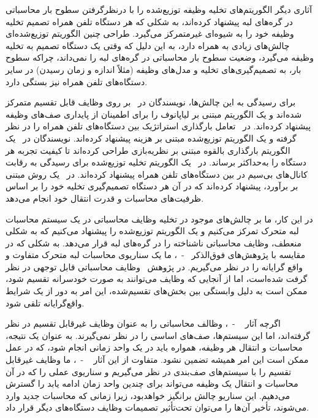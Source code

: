 آثاری دیگر الگوریتم‌های تخلیه وظیفه توزیع‌شده را با درنظرگرفتن سطوح بار محاسباتی در گره‌های لبه پیشنهاد کرده‌اند، به شکلی که هر دستگاه تلفن همراه تصمیم تخلیه وظیفه خود را به شیوه‌ای غیرمتمرکز می‌گیرد. طراحی چنین الگوریتم توزیع‌شده‌ای چالش‌های زیادی به همراه دارد، به این دلیل که وقتی یک دستگاه تصمیم به تخلیه وظیفه می‌گیرد، وضعیت  سطوح بار محاسباتی در گره‌های لبه را نمی‌داند، چراکه سطوح بار، به تصمیم‌گیری‌های تخلیه و مدل‌های وظیفه (مثلاً اندازه و زمان رسیدن) در سایر دستگاه‌های تلفن همراه نیز بستگی دارد. 

برای رسیدگی به این چالش‌ها، نویسندگان در~\cite{lyu2018distributed} بر روی وظایف قابل تقسیم متمرکز شده‌اند و یک الگوریتم مبتنی بر لیاپانوف را برای اطمینان از پایداری صف‌های وظیفه پیشنهاد کرده‌اند. در~\cite{li2019incentive} تعامل بارگذاری استراتژیک بین دستگاه‌های تلفن همراه را در نظر گرفته و یک الگوریتم توزیع‌شده مبتنی بر هزینه پیشنهاد کرده‌اند. نویسندگان در~\cite{shah2018hierarchical} یک الگوریتم بارگذاری بالقوه مبتنی بر نظریه‌بازی طراحی کرده‌اند تا کیفیت تجربه هر دستگاه را به‌حداکثر برساند. در~\cite{yang2018distributed} یک الگوریتم تخلیه توزیع‌شده برای رسیدگی به رقابت کانال‌های بی‌سیم در بین دستگاه‌های تلفن همراه پیشنهاد کرده‌اند. در~\cite{neto2018uloof} یک روش مبتنی بر برآورد، پیشنهاد کرده‌اند که در آن هر دستگاه تصمیم‌گیری تخلیه خود را بر اساس ظرفیت‌های محاسبات و قدرت انتقال خود انجام می‌دهد.



در این کار، ما بر چالش‌های موجود در تخلیه وظایف محاسباتی در یک سیستم محاسبات لبه متحرک تمرکز می‌کنیم و یک الگوریتم توزیع‌شده را پیشنهاد می‌کنیم که به شکلی منعطف، وظایف محاسباتی ناشناخته را در گره‌های لبه قرار می‌دهد. به شکلی که در مقایسه با پژوهش‌های فوق‌الذکر~\cite{lyu2018distributed} -~\cite{neto2018uloof}، ما یک سناریوی محاسبات لبه متحرک متفاوت و واقع گرایانه را در نظر می‌گیریم. در پژوهش~\cite{lyu2018distributed} وظایف محاسباتی قابل توجهی در نظر گرفت شده‌است، اما از آنجایی که وظایف می‌توانند به صورت خودسرانه تقسیم شود، ممکن است به دلیل وابستگی بین بخش‌های تقسیم‌شده، این امر به دور از یک شرایط واقع‌گرایانه تلقی شود. 

اگرچه آثار ~\cite{li2019incentive} -~\cite{neto2018uloof}، وظالف محاسباتی را به عنوان وظایف غیرقابل تقسیم در نظر گرفته‌اند، اما این سیستم‌ها، صف‌های اساسی را در نظر نمی‌گیرند. به عنوان یک نتیجه، محاسبات و انتقال هر وظیفه، همواره باید در یک واحد زمانی انجام شود، که در عمل ممکن است این امر همیشه تضمین نشود. متفاوت از این آثار ~\cite{lyu2018distributed} -~\cite{neto2018uloof}، ما وظایف غیرقابل تقسیم را با سیستم‌های صف‌بندی در نظر می‌گیریم و سناریوی عملی را که در آن محاسبات و انتقال یک وظیفه می‌تواند برای چندین واحد زمان ادامه یابد را گسترش می‌دهیم. این سناریو  چالش برانگیز خواهدبود، زیرا زمانی که محاسبات جدید وارد می‌شوند، تأخیر آن‌ها را می‌توان تحت‌تأثیر تصمیمات وظایف دستگاه‌های دیگر قرار داد.

